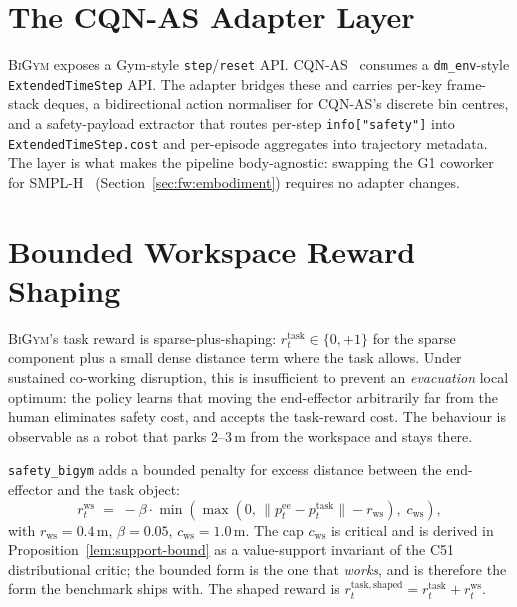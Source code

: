 \documentclass[11pt,a4paper]{report}
\newcommand{\bigym}{\textsc{BiGym}}
\newcommand{\sbigym}{\texttt{safety\_bigym}}
\newcommand{\cqnas}{CQN-AS}
\begin{document}
\section{The \cqnas{} Adapter Layer}
\label{sec:bench:adapter}

\bigym{} exposes a Gym-style \texttt{step}/\texttt{reset} API. \cqnas{}~\cite{seo2024cqnas} consumes a \texttt{dm\_env}-style
\texttt{ExtendedTimeStep} API. The adapter bridges these and carries
per-key frame-stack deques, a bidirectional action normaliser for
\cqnas{}'s discrete bin centres, and a safety-payload extractor that
routes per-step \texttt{info["safety"]} into
\texttt{ExtendedTimeStep.cost} and per-episode aggregates into
trajectory metadata. The layer is what makes the pipeline
body-agnostic: swapping the G1 coworker for
SMPL-H~\cite{romero2017smplh} (Section~\ref{sec:fw:embodiment})
requires no adapter changes.

\section{Bounded Workspace Reward Shaping}
\label{sec:bench:workspace}

\bigym{}'s task reward is sparse-plus-shaping: $r^{\mathrm{task}}_t
\in \{0, +1\}$ for the sparse component plus a small dense distance
term where the task allows. Under sustained co-working disruption,
this is insufficient to prevent an \emph{evacuation} local optimum:
the policy learns that moving the end-effector arbitrarily far from
the human eliminates safety cost, and accepts the task-reward cost.
The behaviour is observable as a robot that parks 2--3\,m from the
workspace and stays there.

\sbigym{} adds a bounded penalty for excess distance between the
end-effector and the task object:
\begin{equation}
  r^{\mathrm{ws}}_t \;=\; -\beta \cdot
    \min\!\left(
      \max(0,\, \|p^{\mathrm{ee}}_t - p^{\mathrm{task}}_t\| - r_{\mathrm{ws}})
      ,\; c_{\mathrm{ws}}
    \right),
  \label{eq:r-workspace}
\end{equation}
with $r_{\mathrm{ws}} = 0.4$\,m, $\beta = 0.05$, $c_{\mathrm{ws}} =
1.0$\,m. The cap $c_{\mathrm{ws}}$ is critical and is derived in
Proposition~\ref{lem:support-bound} as a value-support invariant of the
C51 distributional critic; the bounded form is the one that
\emph{works}, and is therefore the form the benchmark ships with.
The shaped reward is $r^{\mathrm{task,shaped}}_t = r^{\mathrm{task}}_t
+ r^{\mathrm{ws}}_t$.
\end{document}
